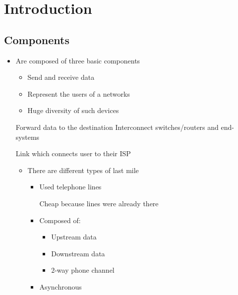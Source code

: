 
\section{Introduction}
\subsection{Components}
\begin{itemize}
    \item Are composed of three basic components
        \begin{itemize}
                \begin{itemize}
                    \item Send and receive data
                    \item Represent the users of a networks
                    \item Huge diversity of such devices
                \end{itemize}
             Forward data to the destination
             Interconnect switches/routers and end-systems
        \end{itemize}
     Link which connects user to their ISP
        \begin{itemize}
            \item There are different types of last mile
                    \begin{itemize}
                        \item Used telephone lines
                            \begin{itemize}
                                \ipro Cheap because lines were already there
                            \end{itemize}
                        \item Composed of:
                            \begin{itemize}
                                \item Upstream data
                                \item Downstream data
                                \item $2$-way phone channel
                            \end{itemize}
                        \item Asynchronous

\end{itemize}
\end{itemize}
\end{itemize}
